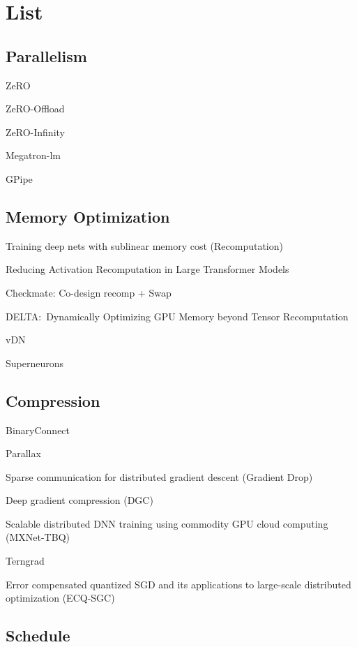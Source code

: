\section{List}
\subsection{Parallelism}


ZeRO~\cite{zero}

ZeRO-Offload~\cite{zero-offload}

ZeRO-Infinity~\cite{zero-infinity}\

Megatron-lm~\cite{megatron-lm}

GPipe~\cite{gpipe}


\subsection{Memory Optimization}

Training deep nets with sublinear memory cost (Recomputation)~\cite{chen2016training}

Reducing Activation Recomputation in Large Transformer Models~\cite{megatron3}

Checkmate: Co-design recomp + Swap~\cite{checkmate}

DELTA:\ Dynamically Optimizing GPU Memory beyond Tensor Recomputation~\cite{tang2022delta}

vDN~\cite{rhu2016vdnn}

Superneurons~\cite{wang2018superneurons}

\subsection{Compression}
BinaryConnect~\cite{courbariaux2015binaryconnect}

Parallax~\cite{kim2019parallax}

Sparse communication for distributed gradient descent (Gradient Drop)~\cite{aji2017sparse}

Deep gradient compression (DGC)~\cite{lin2017deep}

Scalable distributed DNN training using commodity GPU cloud computing (MXNet-TBQ)~\cite{strom2015scalable}

Terngrad~\cite{wen2017terngrad}

Error compensated quantized SGD and its applications to large-scale distributed optimization (ECQ-SGC)~\cite{wu2018error}


\subsection{Schedule}

